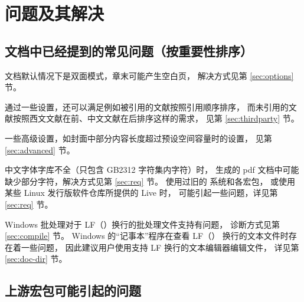 %
%
%
%

\chapter{问题及其解决}
\section{文档中已经提到的常见问题（按重要性排序）}

文档默认情况下是双面模式，章末可能产生空白页，
解决方式见第 \ref{sec:options} 节。

通过一些设置，还可以满足例如被引用的文献按照引用顺序排序，
而未引用的文献按照西文文献在前、中文文献在后排序这样的需求，
见第 \ref{sec:thirdparty} 节。

一些高级设置，如封面中部分内容长度超过预设空间容量时的设置，
见第 \ref{sec:advanced} 节。

中文字体字库不全（只包含 GB2312 字符集内字符）时，
生成的 pdf 文档中可能缺少部分字符，解决方式见第 \ref{sec:req} 节。
使用过旧的  系统和各宏包，
或使用某些 Linux 发行版软件仓库所提供的  Live 时，
可能引起一些问题，详见第 \ref{sec:req} 节。

Windows 批处理对于 LF（\texttt{\string\n}）换行的批处理文件支持有问题，
诊断方式见第 \ref{sec:compile} 节。
Windows 的“记事本”程序在查看 LF（\texttt{\string\n}）
换行的文本文件时存在着一些问题，
因此建议用户使用支持 LF 换行的文本编辑器编辑文件，
详见第 \ref{sec:doc-dir} 节。

\section{上游宏包可能引起的问题}

